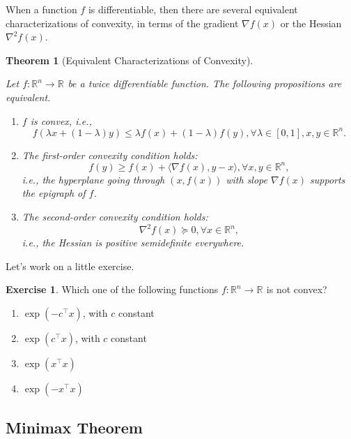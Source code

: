 \documentclass[
]{book}
\newtheorem{theorem}{Theorem}[chapter]
\theoremstyle{definition}
\theoremstyle{definition}
\theoremstyle{definition}
\newtheorem{exercise}{Exercise}[chapter]
\theoremstyle{definition}
\theoremstyle{remark}
\begin{document}
When a function \(f\) is differentiable, then there are several equivalent characterizations of convexity, in terms of the gradient \(\nabla f(x)\) or the Hessian \(\nabla^2 f(x)\).

\begin{theorem}[Equivalent Characterizations of Convexity]
\protect\hypertarget{thm:CharacterizeConvexity}{}\label{thm:CharacterizeConvexity}

Let \(f: \mathbb{R}^{n} \rightarrow \mathbb{R}^{}\) be a twice differentiable function. The following propositions are equivalent.

\begin{enumerate}
\def\labelenumi{\roman{enumi}.}
\item
  \(f\) is convex, i.e.,
  \[
  f(\lambda x + (1-\lambda) y) \leq \lambda f(x) + (1-\lambda) f(y), \forall \lambda \in [0,1], x,y \in \mathbb{R}^{n}.
  \]
\item
  The first-order convexity condition holds:
  \[
  f(y) \geq f(x) + \langle \nabla f(x),  y - x \rangle, \forall x, y \in \mathbb{R}^{n},
  \]
  i.e., the hyperplane going through \((x,f(x))\) with slope \(\nabla f(x)\) supports the epigraph of \(f\).
\item
  The second-order convexity condition holds:
  \[
  \nabla^2 f(x) \succeq 0, \forall x \in \mathbb{R}^{n},
  \]
  i.e., the Hessian is positive semidefinite everywhere.
\end{enumerate}

\end{theorem}

Let's work on a little exercise.

\begin{exercise}

Which one of the following functions \(f: \mathbb{R}^{n} \rightarrow \mathbb{R}^{}\) is not convex?

\begin{enumerate}
\def\labelenumi{\alph{enumi}.}
\item
  \(\exp(-c^\top x)\), with \(c\) constant
\item
  \(\exp(c^\top x)\), with \(c\) constant
\item
  \(\exp(x^\top x)\)
\item
  \(\exp(-x^\top x)\)
\end{enumerate}

\end{exercise}

\hypertarget{minimax-theorem}{%
\subsection{Minimax Theorem}\label{minimax-theorem}}
\end{document}
